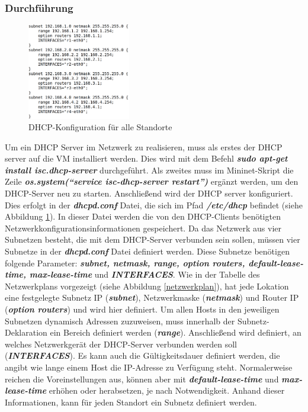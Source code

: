 \documentclass[fontsize=12pt,paper=a4,open=any,parskip=half,
  twoside=false,toc=listof,toc=bibliography,fleqn,leqno,
  captions=nooneline,captions=tableabove,british]{scrbook}
\begin{document}
\subsubsection{Durchführung}
\begin{figure}
	\vspace{-\baselineskip}
 	\centering
 	\includegraphics[width=0.4\textwidth]{Bilder/dhcp2}
 	\caption{DHCP-Konfiguration für alle Standorte}
 	\label{dhcp2}
\end{figure}
Um ein DHCP Server im Netzwerk zu realisieren, muss als erstes der DHCP server auf die VM installiert werden. Dies wird mit dem Befehl \textit{\textbf{sudo apt-get install isc.dhcp-server}} durchgeführt. Als zweites muss im Mininet-Skript die Zeile \textit{\textbf{os.system(“service isc-dhcp-server restart”)}} ergänzt werden, um den DHCP-Server neu zu starten. Anschließend wird der DHCP server konfiguriert. Dies erfolgt in der \textit{\textbf{dhcpd.conf}} Datei, die sich im Pfad \textit{\textbf{/etc/dhcp}} befindet (siehe Abbildung \ref{dhcp2}). In dieser Datei werden die von den DHCP-Clients benötigten Netzwerkkonfigurationsinformationen gespeichert. Da das Netzwerk aus vier Subnetzen besteht, die mit dem DHCP-Server verbunden sein sollen, müssen vier Subnetze in der \textit{\textbf{dhcpd.conf}} Datei definiert werden. Diese Subnetze benötigen folgende Parameter: \textit{\textbf{subnet, netmask, range, option routers, default-lease-time, max-lease-time}} und \textit{\textbf{INTERFACES}}. Wie in der Tabelle des Netzwerkplans vorgezeigt (siehe Abbildung \ref{netzwerkplan}), hat jede Lokation eine festgelegte Subnetz IP (\textit{\textbf{subnet}}), Netzwerkmaske (\textit{\textbf{netmask}}) und Router IP (\textit{\textbf{option routers}}) und wird hier definiert. Um allen Hosts in den jeweiligen Subnetzen dynamisch Adressen zuzuweisen, muss innerhalb der Subnetz-Deklaration ein Bereich definiert werden (\textit{\textbf{range}}). Anschließend wird definiert, an welches Netzwerkgerät der DHCP-Server verbunden werden soll (\textit{\textbf{INTERFACES}}). Es kann auch die Gültigkeitsdauer definiert werden, die angibt wie lange einem Host die IP-Adresse zu Verfügung steht. Normalerweise reichen die Voreinstellungen aus, können aber mit \textit{\textbf{default-lease-time}} und \textit{\textbf{max-lease-time}} erhöhen oder herabsetzen, je nach Notwendigkeit. Anhand dieser Informationen, kann für jeden Standort ein Subnetz definiert werden. 
\end{document}
